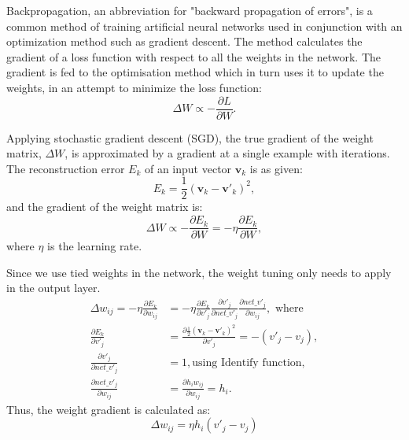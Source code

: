	Backpropagation, an abbreviation for "backward propagation of errors", is a common method of training artificial neural networks used in conjunction with an optimization method such as gradient descent.
	The method calculates the gradient of a loss function with respect to all the weights in the network.
	The gradient is fed to the optimisation method which in turn uses it to update the weights, in an attempt to minimize the loss function:
	\begin{equation}
	\Delta W \propto -\frac{\partial L}{\partial W}.
	\end{equation}
	
	Applying stochastic gradient descent (SGD), the true gradient of the weight matrix, $\Delta W$, is approximated by a gradient at a single example with iterations.
	The reconstruction error $E_k$ of an input vector $\mathbf{v}_k$ is as given:
	\begin{equation}
	E_k = \frac{1}{2}(\mathbf{v}_k - \mathbf{v'}_k)^2,
	\end{equation}
	and the gradient of the weight matrix is:
	\begin{equation}
	\Delta W \propto -\frac{\partial E_k}{\partial W}=-\eta \frac{\partial E_k}{\partial W},
	\end{equation}
	where $\eta$ is the learning rate.
	
	Since we use tied weights in the network, the weight tuning only needs to apply in the output layer.
	\begin{equation}
	\begin{aligned}
	\Delta w_{ij} = -\eta \frac{\partial E_k}{\partial w_{ij}} &= -\eta \frac{\partial E_k}{\partial v'_j} \frac{\partial v'_j}{\partial net\_v'_j} \frac{\partial net\_v'_j}{\partial w_{ij}}, \textrm{ where} \\
	\frac{\partial E_k}{\partial v'_j} &= \frac{\partial \frac{1}{2}(\mathbf{v}_k - \mathbf{v'}_k)^2}{\partial v'_j}= -(v'_j - v_j), \\
	\frac{\partial v'_j}{\partial net\_v'_j} &= 1, \textrm{using Identify function,}\\
	\frac{\partial net\_v'_j}{\partial w_{ij}} &= \frac{\partial h_i w_{ij}}{\partial w_{ij}} = h_i.
	\end{aligned}
	\end{equation}
	Thus, the weight gradient is calculated as:
	\begin{equation}
	\Delta w_{ij} = \eta h_i(v'_j - v_j)
	\end{equation}
	
